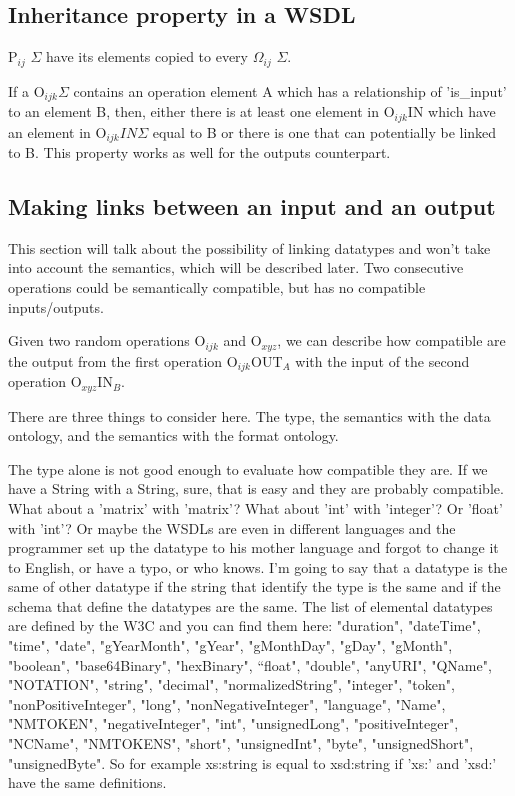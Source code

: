 \documentclass[a4paper,10pt]{article}
\begin{document}
  \subsection{Inheritance property in a WSDL}

  P$_{ij}$ $\Sigma$ have its elements copied to every $\Omega_{ij}$ $\Sigma$.\vspace{3 mm}

  If a O$_{ijk}\Sigma$ contains an operation element A which has a relationship of 'is\_input' to an element B, then, either there is at least one element in O$_{ijk}$IN which have an element in O$_{ijk}IN\Sigma$ equal to B or there is one that can potentially be linked to B. This property works as well for the outputs counterpart.

  \subsection{Making links between an input and an output}
  \label{sec:makinglinks}

  This section will talk about the possibility of linking datatypes and won't take into account the semantics, which will be described later. Two consecutive operations could be semantically compatible, but has no compatible inputs/outputs.\vspace{3 mm}

  Given two random operations O$_{ijk}$ and  O$_{xyz}$, we can describe how compatible are the output from the first operation O$_{ijk}$OUT$_{A}$ with the input of the second operation O$_{xyz}$IN$_{B}$.\vspace{3 mm}

  There are three things to consider here. The type, the semantics with the data ontology, and the semantics with the format ontology.\vspace{3 mm} 

  The type alone is not good enough to evaluate how compatible they are. If we have a String with a String, sure, that is easy and they are probably compatible. What about a 'matrix' with 'matrix'? What about 'int' with 'integer'? Or 'float' with 'int'? Or maybe the WSDLs are even in different languages and the programmer set up the datatype to his mother language and forgot to change it to English, or have a typo, or who knows. I'm going to say that a datatype is the same of other datatype if the string that identify the type is the same and if the schema that define the datatypes are the same. The list of elemental datatypes are defined by the W3C and you can find them here: "duration", "dateTime", "time", "date", "gYearMonth", "gYear", "gMonthDay", "gDay", "gMonth", "boolean", "base64Binary", "hexBinary", “float", "double", "anyURI", "QName", "NOTATION", "string", "decimal", "normalizedString", "integer", "token", "nonPositiveInteger", "long", "nonNegativeInteger", "language", "Name", "NMTOKEN", "negativeInteger", "int", "unsignedLong", "positiveInteger", "NCName", "NMTOKENS", "short", "unsignedInt", "byte", "unsignedShort", "unsignedByte". So for example xs:string is equal to xsd:string if 'xs:' and 'xsd:' have the same definitions.\vspace{3 mm}
\end{document}
